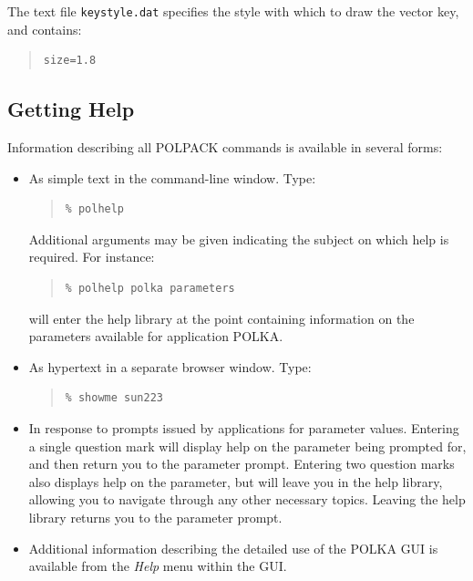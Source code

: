 \documentclass[twoside,11pt]{article}
\newcommand{\xlabel}[1]{}
\renewcommand{\_}{\texttt{\symbol{95}}}
\newenvironment{myquote}{\begin{quote}\begin{small}}{\end{small}\end{quote}}
\begin{document}
The text file \texttt{keystyle.dat} specifies the style with which to draw the 
vector key, and contains:

\begin{myquote}
\begin{verbatim}
size=1.8
\end{verbatim}
\end{myquote}



\subsection{\xlabel{gettinghelp}Getting Help}
Information describing all POLPACK commands is available in several forms: 
\begin{itemize}
\item As simple text in the command-line window. Type:

\begin{myquote}
\begin{verbatim}
% polhelp
\end{verbatim}
\end{myquote}

Additional arguments may be given indicating the subject on which help is
required. For instance:

\begin{myquote}
\begin{verbatim}
% polhelp polka parameters
\end{verbatim}
\end{myquote}

will enter the help library at the point containing information on the
parameters available for application POLKA.

\item As hypertext in a separate browser window. Type:

\begin{myquote}
\begin{verbatim}
% showme sun223
\end{verbatim}
\end{myquote}

\item In response to prompts issued by applications for parameter values. 
Entering a single question mark will display help on the parameter being
prompted for, and then return you to the parameter prompt. Entering two
question marks also displays help on the parameter, but will leave you in the
help library, allowing you to navigate through any other necessary
topics. Leaving the help library returns you to the parameter prompt.

\item Additional information describing the detailed use of the POLKA
GUI is available from the \emph{Help} menu within the GUI.

\end{itemize}
\end{document}
